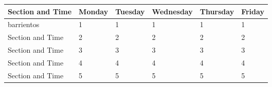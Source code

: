 \def \firstPeriod{1}
\def \secondPeriod{2}
\def \thirdPeriod{3}
\def \fourthPeriod{4}
\def \fifthPeriod{5}
\def \sixthPeriod{6}

\noindent\begin{minipage}[c]{\textwidth}
\begin{center}
  \begin{tabular}{ *{6}{|C{120pt}}|  }
    \hline
   \textbf{ Section and Time} & \textbf{Monday} & \textbf{Tuesday} & \textbf{Wednesday} & \textbf{Thursday} & \textbf{Friday} \\
    \hline
        barrientos & \firstPeriod & \firstPeriod & \firstPeriod & \firstPeriod & \firstPeriod \\
    \hline
        Section and Time & \secondPeriod & \secondPeriod & \secondPeriod & \secondPeriod & \secondPeriod \\
    \hline
        Section and Time & \thirdPeriod & \thirdPeriod & \thirdPeriod & \thirdPeriod & \thirdPeriod \\
    \hline
        Section and Time & \fourthPeriod & \fourthPeriod & \fourthPeriod & \fourthPeriod & \fourthPeriod \\
    \hline
        Section and Time & \fifthPeriod & \fifthPeriod & \fifthPeriod & \fifthPeriod & \fifthPeriod \\
  \hline
 \end{tabular}
\end{center}
\end{minipage}
